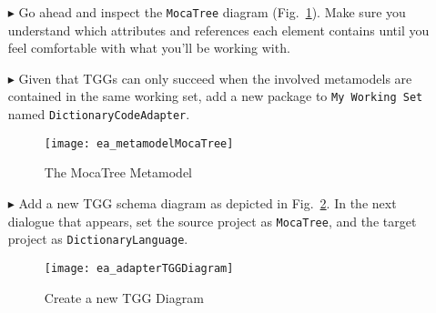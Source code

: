 \begin{itemize}

\item[$\blacktriangleright$] Go ahead and inspect the \texttt{MocaTree} diagram (Fig.~\ref{ea:mocaTree}). Make sure you understand which attributes and
references each element contains until you feel comfortable with what you'll be working with.

\item[$\blacktriangleright$] Given that TGGs can only succeed when the involved metamodels are contained in the same working set, add a new package to
\texttt{My Working Set} named \texttt{Dict\-ion\-ary\-Code\-Adap\-ter}.

\newpage

\begin{figure}[htpb]
\begin{center}
  \texttt{[image: ea\_metamodelMocaTree]}
  \caption{The MocaTree Metamodel}
  \label{ea:mocaTree}
\end{center}
\end{figure}

\vspace{1cm}

\item[$\blacktriangleright$] Add a new TGG schema diagram as depicted in Fig.~\ref{ea:newTGGDiagram}. In the next dialogue that appears, set the source project
as \texttt{MocaTree}, and the target project as \texttt{Dict\-ion\-ary\-Lang\-uage}.

\vspace{1cm}

\begin{figure}[htpb]
\begin{center}
  \texttt{[image: ea\_adapterTGGDiagram]}
  \caption{Create a new TGG Diagram}
  \label{ea:newTGGDiagram}
\end{center}
\end{figure}

\end{itemize}

\clearpage

